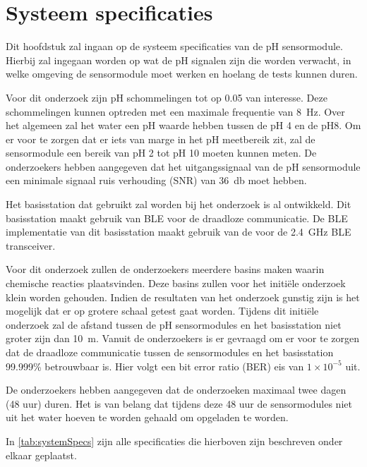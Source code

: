 \section{Systeem specificaties}\label{sec:systemSpecifications}

Dit hoofdstuk zal ingaan op de systeem specificaties van de pH sensormodule. Hierbij zal ingegaan worden op wat de pH signalen zijn die worden verwacht, in welke omgeving de sensormodule moet werken en hoelang de tests kunnen duren.

Voor dit onderzoek zijn pH schommelingen tot op \qty{0.05}{\pH} van interesse. Deze schommelingen kunnen optreden met een maximale frequentie van \qty{8}{\hertz}. Over het algemeen zal het water een pH waarde hebben tussen de pH 4 en de pH8. Om er voor te zorgen dat er iets van marge in het pH meetbereik zit, zal de sensormodule een bereik van pH 2 tot pH 10 moeten kunnen meten. De onderzoekers hebben aangegeven dat het uitgangssignaal van de pH sensormodule een minimale signaal ruis verhouding (SNR) van \qty{36}{\decibel} moet hebben.

Het basisstation dat gebruikt zal worden bij het onderzoek is al ontwikkeld. Dit basisstation maakt gebruik van BLE voor de draadloze communicatie. De BLE implementatie van dit basisstation maakt gebruik van de \mcu voor de \qty{2.4}{\giga\hertz} BLE transceiver. 

Voor dit onderzoek zullen de onderzoekers meerdere basins maken waarin chemische reacties plaatsvinden. Deze basins zullen voor het initiële onderzoek klein worden gehouden. Indien de resultaten van het onderzoek gunstig zijn is het mogelijk dat er op grotere schaal getest gaat worden. Tijdens dit initiële onderzoek zal de afstand tussen de pH sensormodules en het basisstation niet groter zijn dan \qty{10}{\meter}. Vanuit de onderzoekers is er gevraagd om er voor te zorgen dat de draadloze communicatie tussen de sensormodules en het basisstation 99.999\% betrouwbaar is. Hier volgt een bit error ratio (BER) eis van $1\times 10^{-5}$ uit.

De onderzoekers hebben aangegeven dat de onderzoeken maximaal twee dagen (48 uur) duren. Het is van belang dat tijdens deze 48 uur de sensormodules niet uit het water hoeven te worden gehaald om opgeladen te worden. 


In \cref{tab:systemSpecs} zijn alle specificaties die hierboven zijn beschreven onder elkaar geplaatst.

